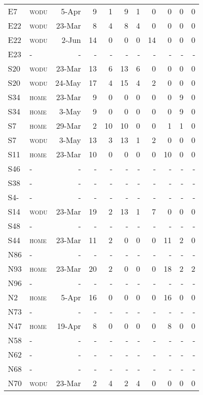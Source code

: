 {\begin{landscape}
\begin{Spacing}{1}
\begin{longtable}[l]{@{}llrrrrrrrrr}
E7 & \textsc{wodu} & 5-Apr & 9 & 1 & 9 & 1 & 0 & 0 & 0 & 0 \tabularnewline
E22 & \textsc{wodu} & 23-Mar & 8 & 4 & 8 & 4 & 0 & 0 & 0 & 0 \tabularnewline
E22 & \textsc{wodu} & 2-Jun & 14 & 0 & 0 & 0 & 14 & 0 & 0 & 0 \tabularnewline
E23 & - & - & - & - & - & - & - & - & - & - \tabularnewline
S20 & \textsc{wodu} & 23-Mar & 13 & 6 & 13 & 6 & 0 & 0 & 0 & 0 \tabularnewline
S20 & \textsc{wodu} & 24-May & 17 & 4 & 15 & 4 & 2 & 0 & 0 & 0 \tabularnewline
S34 & \textsc{home} & 23-Mar & 9 & 0 & 0 & 0 & 0 & 0 & 9 & 0 \tabularnewline
S34 & \textsc{home} & 3-May & 9 & 0 & 0 & 0 & 0 & 0 & 9 & 0 \tabularnewline
S7 & \textsc{home} & 29-Mar & 2 & 10 & 10 & 0 & 0 & 1 & 1 & 0 \tabularnewline
S7 & \textsc{wodu} & 3-May & 13 & 3 & 13 & 1 & 2 & 0 & 0 & 0 \tabularnewline
S11 & \textsc{home} & 23-Mar & 10 & 0 & 0 & 0 & 0 & 10 & 0 & 0 \tabularnewline
S46 & - & - & - & - & - & - & - & - & - & - \tabularnewline
S38 & - & - & - & - & - & - & - & - & - & - \tabularnewline
S4- & - & - & - & - & - & - & - & - & - & - \tabularnewline
S14 & \textsc{wodu} & 23-Mar & 19 & 2 & 13 & 1 & 7 & 0 & 0 & 0 \tabularnewline
S48 & - & - & - & - & - & - & - & - & - & - \tabularnewline
S44 & \textsc{home} & 23-Mar & 11 & 2 & 0 & 0 & 0 & 11 & 2 & 0 \tabularnewline
N86 & - & - & - & - & - & - & - & - & - & - \tabularnewline
N93 & \textsc{home} & 23-Mar & 20 & 2 & 0 & 0 & 0 & 18 & 2 & 2 \tabularnewline
N96 & - & - & - & - & - & - & - & - & - & - \tabularnewline
N2 & \textsc{home} & 5-Apr & 16 & 0 & 0 & 0 & 0 & 16 & 0 & 0 \tabularnewline
N73 & - & - & - & - & - & - & - & - & - & - \tabularnewline
N47 & \textsc{home} & 19-Apr & 8 & 0 & 0 & 0 & 0 & 8 & 0 & 0 \tabularnewline
N58 & - & - & - & - & - & - & - & - & - & - \tabularnewline
N62 & - & - & - & - & - & - & - & - & - & - \tabularnewline
N68 & - & - & - & - & - & - & - & - & - & - \tabularnewline
N70 & \textsc{wodu} & 23-Mar & 2 & 4 & 2 & 4 & 0 & 0 & 0 & 0 \tabularnewline\bottomrule
\end{longtable}
\end{Spacing}
\end{landscape}
\clearpage
}